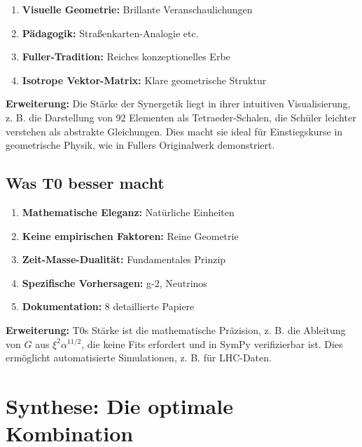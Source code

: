 \documentclass[12pt,a4paper]{article}
\newcommand{\xipar}{\xi}
\begin{document}
	\begin{enumerate}
		\item \textbf{Visuelle Geometrie:} Brillante Veranschaulichungen
		\item \textbf{Pädagogik:} Straßenkarten-Analogie etc.
		\item \textbf{Fuller-Tradition:} Reiches konzeptionelles Erbe
		\item \textbf{Isotrope Vektor-Matrix:} Klare geometrische Struktur
	\end{enumerate}
	
	\textbf{Erweiterung:} Die Stärke der Synergetik liegt in ihrer intuitiven Visualisierung, z. B. die Darstellung von 92 Elementen als Tetraeder-Schalen, die Schüler leichter verstehen als abstrakte Gleichungen. Dies macht sie ideal für Einstiegskurse in geometrische Physik, wie in Fullers Originalwerk demonstriert.
	
	\subsection{Was T0 besser macht}
	
	\begin{enumerate}
		\item \textbf{Mathematische Eleganz:} Natürliche Einheiten
		\item \textbf{Keine empirischen Faktoren:} Reine Geometrie
		\item \textbf{Zeit-Masse-Dualität:} Fundamentales Prinzip
		\item \textbf{Spezifische Vorhersagen:} g-2, Neutrinos
		\item \textbf{Dokumentation:} 8 detaillierte Papiere
	\end{enumerate}
	
	\textbf{Erweiterung:} T0s Stärke ist die mathematische Präzision, z. B. die Ableitung von $G$ aus $\xipar^2 \alpha^{11/2}$, die keine Fits erfordert und in SymPy verifizierbar ist. Dies ermöglicht automatisierte Simulationen, z. B. für LHC-Daten.
	
	\section{Synthese: Die optimale Kombination}
	
\end{document}
